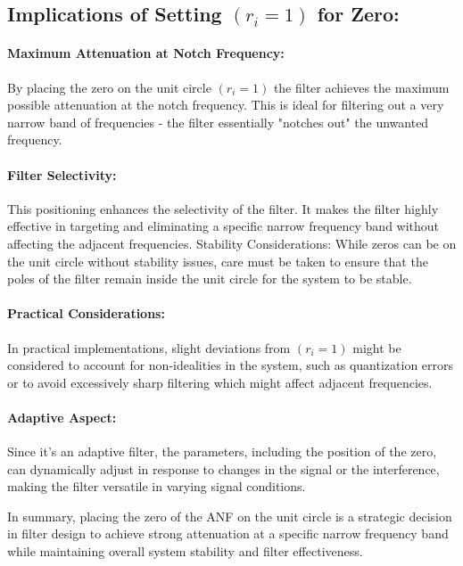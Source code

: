 \subsection{Implications of Setting $\left(r_{i}=1\right)$ for Zero:}

\paragraph{Maximum Attenuation at Notch Frequency:} By placing the zero on the unit circle $\left(r_{i}=1\right)$ the filter achieves the maximum possible attenuation at the notch frequency. This is ideal for filtering out a very narrow band of frequencies - the filter essentially "notches out" the unwanted frequency.

\paragraph{Filter Selectivity: }This positioning enhances the selectivity of the filter. It makes the filter highly effective in targeting and eliminating a specific narrow frequency band without affecting the adjacent frequencies. Stability Considerations: While zeros can be on the unit circle without stability issues, care must be taken to ensure that the poles of the filter remain inside the unit circle for the system to be stable.

\paragraph{Practical Considerations:} In practical implementations, slight deviations from $\left(r_{i}=1\right)$ might be considered to account for non-idealities in the system, such as quantization errors or to avoid excessively sharp filtering which might affect adjacent frequencies.

\paragraph{Adaptive Aspect:} Since it's an adaptive filter, the parameters, including the position of the zero, can dynamically adjust in response to changes in the signal or the interference, making the filter versatile in varying signal conditions.

In summary, placing the zero of the ANF on the unit circle is a strategic decision in filter design to achieve strong attenuation at a specific narrow frequency band while maintaining overall system stability and filter effectiveness.


